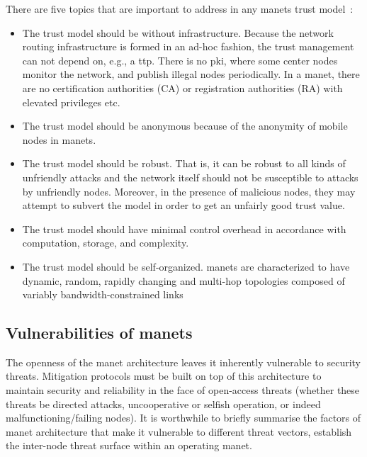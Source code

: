 There are five topics that are important to address in any \glspl{manet} trust model~\cite{Kamvar2003}:
%
\begin{itemize}
  \item The trust model should be without infrastructure.
    Because the network routing infrastructure is formed in an ad-hoc fashion, the trust management can not depend on, e.g., a \acrfull{ttp}.
    There is no \gls{pki}, where some center nodes monitor the network, and publish illegal nodes periodically.
    In a \gls{manet}, there are no certification authorities (CA) or registration authorities (RA) with elevated privileges etc.
  \item The trust model should be anonymous because of the anonymity of mobile nodes in \glspl{manet}. %
  \item The trust model should be robust.
    That is, it can be robust to all kinds of unfriendly attacks and the network itself should not be susceptible to attacks by unfriendly nodes.
    Moreover, in the presence of malicious nodes, they may attempt to subvert the model in order to get an unfairly good trust value.
  \item The trust model should have minimal control overhead in accordance with computation, storage, and complexity.
  \item The trust model should be self-organized.
    \glspl{manet} are characterized to have dynamic, random, rapidly changing and multi-hop topologies composed of variably bandwidth-constrained links
\end{itemize}
%

\subsection{Vulnerabilities of \glspl{manet}}\label{sec:manet_vuln}

The openness of the \gls{manet} architecture leaves it inherently vulnerable to security threats. 
Mitigation protocols must be built on top of this architecture to maintain security and reliability in the face of open-access threats (whether these threats be directed attacks, uncooperative or selfish operation, or indeed malfunctioning/failing nodes).
It is worthwhile to briefly summarise the factors of \gls{manet} architecture that make it vulnerable to different threat vectors, establish the inter-node threat surface within an operating \gls{manet}.

